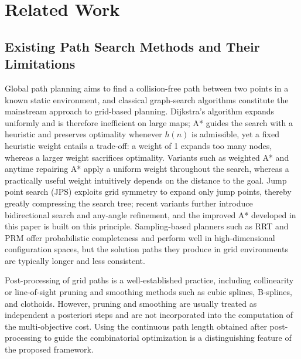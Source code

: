 \section{Related Work}
\label{sec:related}

\subsection{Existing Path Search Methods and Their Limitations}

Global path planning aims to find a collision-free path between two points in a known static environment, and classical graph-search algorithms constitute the mainstream approach to grid-based planning\textcolor{blue}{\cite{ref33,ref34,ref35}}. Dijkstra's algorithm expands uniformly and is therefore inefficient on large maps\textcolor{blue}{\cite{ref6}}; A* guides the search with a heuristic and preserves optimality whenever $h(n)$ is admissible\textcolor{blue}{\cite{ref5}}, yet a fixed heuristic weight entails a trade-off: a weight of 1 expands too many nodes, whereas a larger weight sacrifices optimality\textcolor{blue}{\cite{ref8}}. Variants such as weighted A* and anytime repairing A* apply a uniform weight throughout the search\textcolor{blue}{\cite{ref8,ref10}}, whereas a practically useful weight intuitively depends on the distance to the goal. Jump point search (JPS) exploits grid symmetry to expand only jump points, thereby greatly compressing the search tree\textcolor{blue}{\cite{ref11,ref12,ref44}}; recent variants further introduce bidirectional search and any-angle refinement\textcolor{blue}{\cite{ref13,ref14,ref15}}, and the improved A* developed in this paper is built on this principle. Sampling-based planners such as RRT\textcolor{blue}{\cite{ref7}} and PRM offer probabilistic completeness and perform well in high-dimensional configuration spaces, but the solution paths they produce in grid environments are typically longer and less consistent.

Post-processing of grid paths is a well-established practice, including collinearity or line-of-sight pruning\textcolor{blue}{\cite{ref16}} and smoothing methods such as cubic splines, B-splines, and clothoids\textcolor{blue}{\cite{ref17,ref18,ref41}}. However, pruning and smoothing are usually treated as independent a posteriori steps and are not incorporated into the computation of the multi-objective cost. Using the continuous path length obtained after post-processing to guide the combinatorial optimization is a distinguishing feature of the proposed framework.

